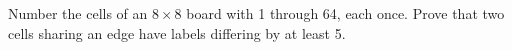 Number the cells of an $8\times8$ board with 1 through 64, each once. Prove that two cells sharing an edge have labels differing by at least 5.

